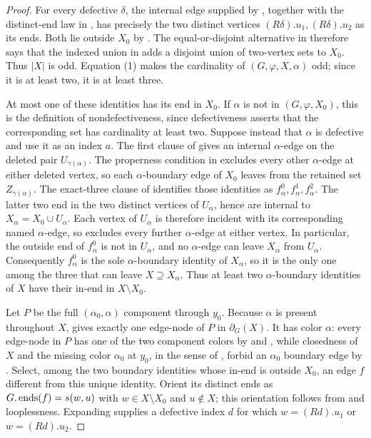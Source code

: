 \begin{proof}
For every defective $\delta$, the internal edge supplied by
, together with the distinct-end
law in , has precisely the two distinct
vertices $(R\delta).u_1,(R\delta).u_2$ as its ends.  Both lie outside
$X_0$ by .  The equal-or-disjoint alternative in
 therefore says that the indexed
union in  adds a disjoint union of
two-vertex sets to $X_0$.  Thus $|X|$ is odd.  Equation (1) makes the
cardinality of
$(G,\varphi,X,\alpha)$ odd; since it is at
least two, it is at least three.

At most one of these identities has its end in $X_0$.  If $\alpha$ is
not in $(G,\varphi,X_0)$, this is the definition
of nondefectiveness, since defectiveness asserts that the corresponding
 set has cardinality at least two.  Suppose
instead that $\alpha$ is defective and use it as an index $a$.  The first
clause of
 gives an internal
$\alpha$-edge on the deleted pair $U_{\gamma(\alpha)}$.  The properness
condition in  excludes every other
$\alpha$-edge at either deleted vertex, so each
$\alpha$-boundary edge of $X_0$ leaves from the retained set
$Z_{\gamma(\alpha)}$.  The exact-three clause of
 identifies those identities as
$f^0_\alpha,f^1_\alpha,f^2_\alpha$.  The latter two end in the two
distinct vertices of $U_\alpha$, hence are internal to
$X_\alpha=X_0\cup U_\alpha$.  Each vertex of $U_\alpha$ is therefore
incident with its corresponding named $\alpha$-edge, so
 excludes every further $\alpha$-edge at
either vertex.  In particular, the outside end of $f^0_\alpha$ is not in
$U_\alpha$, and no $\alpha$-edge can leave $X_\alpha$ from
$U_\alpha$.  Consequently
$f^0_\alpha$ is the sole $\alpha$-boundary identity of $X_\alpha$, so it
is the only one among the three that can leave $X\supseteq X_\alpha$.
Thus at least two $\alpha$-boundary identities of $X$ have their in-end
in $X\setminus X_0$.

Let $P$ be the full $(\alpha_0,\alpha)$ component through $y_0$.
Because $\alpha$ is present throughout $X$,
 gives exactly one edge-node of
$P$ in $\partial_G(X)$.  It has color $\alpha$: every edge-node in $P$
has one of the two component colors by  and
, while closedness of $X$ and the missing
color $\alpha_0$ at $y_0$, in the sense of ,
forbid an $\alpha_0$ boundary edge by
.  Select,
among the two boundary identities whose in-end is outside $X_0$, an edge
$f$ different from this unique identity.  Orient its distinct ends as
$G.\mathop{\rm ends}(f)=s(w,u)$ with
$w\in X\setminus X_0$ and $u\notin X$; this orientation follows from
 and looplessness.  Expanding
 supplies a defective index $d$ for
which $w=(R d).u_1$ or $w=(R d).u_2$.


\end{proof}
